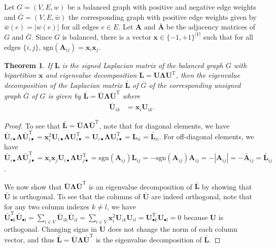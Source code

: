 \documentclass[11pt,a4paper]{book}
\newtheorem{theorem}{Theorem}
\begin{document}
Let $G = (V, E, w)$ be a balanced graph with positive and
negative edge weights
and $\bar G = (V, E, \bar w)$ the corresponding graph with
positive edge weights given by 
$\bar w(e) = |w(e)|$ for all edges $e\in E$. 
Let $\mathbf A$ and $\mathbf{\bar A}$ be the adjacency matrices of $G$
and $\bar G$.  
Since $G$ is balanced, there is a vector $\mathbf x \in \{-1,+1\}^{|V|}$ such
that for all edges $\{i,j\}$, $\mathrm{sgn}(\mathbf A_{ij}) = \mathbf x_i \mathbf x_j$. 

\begin{theorem}
  \label{theo:two}
  If $\mathbf L$ is the signed Laplacian matrix of the balanced graph
  $G$ with bipartition $\mathbf x$ and eigenvalue
  decomposition $\mathbf L = \mathbf U \mathbf \Lambda \mathbf U^{\mathrm T}$, 
  then the eigenvalue decomposition of the Laplacian matrix $\mathbf{\bar L}$
  of $\bar G$
  of the corresponding unsigned graph $\bar G$ of $G$ is given by 
  $\mathbf{\bar L} = \mathbf{\bar U} \mathbf \Lambda 
  \mathbf{\bar U}^{\mathrm T}$  where
  \begin{align}
    \mathbf{\bar U}_{ik} &= \mathbf x_i \mathbf U_{ik}.
  \end{align}
\end{theorem}
\begin{proof}
  To see that $\mathbf{\bar L} = \mathbf{\bar U} \mathbf \Lambda 
  \mathbf{\bar U}^{\mathrm T}$, note that for
  diagonal elements, we have $\mathbf{\bar U}_{i\bullet}^{\phantom{\mathrm
      I}} \mathbf \Lambda \mathbf{\bar U}_{i\bullet}^{\mathrm T} = 
  \mathbf x_i^2 \mathbf U_{i\bullet}^{\phantom{\mathrm I}}
  \mathbf \Lambda \mathbf U_{i\bullet}^{\mathrm T} = \mathbf
  U_{i\bullet}^{\phantom{\mathrm I}} \mathbf \Lambda \mathbf
  U_{i\bullet}^{\mathrm T} = \mathbf L_{ii} = \mathbf{\bar L}_{ii}$.  
  For off-diagonal elements, we have $\mathbf{\bar
    U}_{i\bullet}^{\phantom{\mathrm I}} \mathbf \Lambda 
  \mathbf{\bar U}_{j\bullet}^{\mathrm T} = \mathbf x_i \mathbf x_j \mathbf
  U_{i\bullet}^{\phantom{\mathrm I}} \mathbf \Lambda \mathbf
  U_{j\bullet}^{\mathrm T} = \mathrm{sgn}(\mathbf A_{ij}) 
  \mathbf L_{ij} =
  - \mathrm{sgn}(\mathbf A_{ij}) \mathbf A_{ij} = -|\mathbf A_{ij}| = -
  \mathbf{\bar A}_{ij} = 
  \mathbf{\bar L}_{ij}$.  

  We now show that $\mathbf{\bar U} \mathbf \Lambda 
  \mathbf{\bar U}^{\mathrm T}$ is an eigenvalue
  decomposition of $\mathbf{\bar L}$ by showing that $\mathbf{\bar U}$
  is orthogonal. 
  To see that the columns of $\mathbf{\bar U}$ are indeed orthogonal, note that for any
  two column indexes $k \neq l$, we have $\mathbf{\bar U}_{\bullet k}^{\mathrm T}
  \mathbf{\bar U}_{\bullet l}^{\phantom{\mathrm I}} =
  \sum_{i \in V} \mathbf{\bar U}_{ik} \mathbf{\bar U}_{il} = \sum_{i \in V} \mathbf x_i^2
  \mathbf U_{ik} \mathbf U_{il} =
  \mathbf U_{\bullet k}^{\mathrm T} \mathbf U_{\bullet
    l}^{\phantom{\mathrm I}} = 0$ because $\mathbf U$ is orthogonal. 
  Changing signs in $\mathbf U$ does not change the norm of each column vector,
  and thus $\mathbf{\bar L} = \mathbf{\bar U} \mathbf \Lambda 
  \mathbf{\bar U}^{\mathrm T}$ is the
  eigenvalue decomposition of $\mathbf{\bar L}$.
\end{proof}
\end{document}
